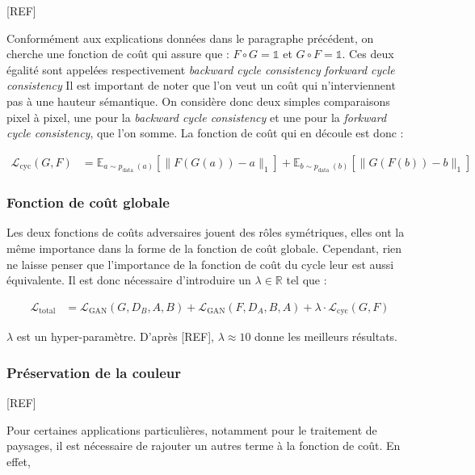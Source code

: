 [REF]

Conformément aux explications données dans le paragraphe précédent, on cherche une fonction de coût qui assure que : $ F \circ G = \mathbb{1} $ et $ G \circ F = \mathbb{1} $. Ces deux égalité sont appelées respectivement \textit{backward cycle consistency} \textit{forkward cycle consistency} Il est important de noter que l'on veut un coût qui n'interviennent pas à une hauteur sémantique. On considère donc deux simples comparaisons pixel à pixel, une pour la \textit{backward cycle consistency} et une pour la \textit{forkward cycle consistency}, que l'on somme. La fonction de coût qui en découle est donc :

$$\begin{aligned}
\mathcal{L}_{\mathrm{cyc}}(G, F) &=\mathbb{E}_{a \sim p_{\text {data }}(a)}\left[\|F(G(a))-a\|_{1}\right] +\mathbb{E}_{b \sim p_{\text {data }}(b)}\left[\|G(F(b))-b\|_{1}\right]
\end{aligned}$$

\subsubsection{Fonction de coût globale}

Les deux fonctions de coûts adversaires jouent des rôles symétriques, elles ont la même importance dans la forme de la fonction de coût globale. Cependant, rien ne laisse penser que l'importance de la fonction de coût du cycle leur est aussi équivalente. Il est donc nécessaire d'introduire un $\lambda \in \mathbb{R}$ tel que :

$$\begin{aligned}
\mathcal{L}_{\text{total}} &=\mathcal{L}_{\mathrm{GAN}}\left(G, D_{B}, A, B\right) +\mathcal{L}_{\mathrm{GAN}}\left(F, D_{A}, B, A\right) +\lambda \cdot \mathcal{L}_{\mathrm{cyc}}(G, F)
\end{aligned}$$

$\lambda$ est un hyper-paramètre. D'après [REF], $\lambda \approx 10$ donne les meilleurs résultats.

\subsubsection{Préservation de la couleur}

[REF]

Pour certaines applications particulières, notamment pour le traitement de paysages, il est nécessaire de rajouter un autres terme à la fonction de coût. En effet, 

